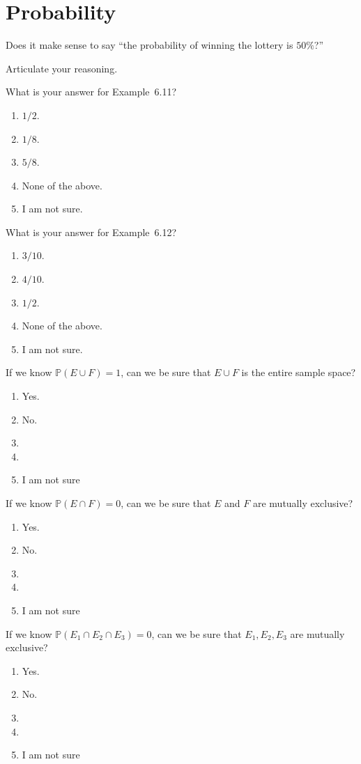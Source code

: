 \documentclass[t, 14pt]{beamer}
\newcommand{\yesno}{
 \begin{enumerate}
    \item Yes.
    \item No.
    \item 
    \item 
    \item I am not sure
  \end{enumerate} 
}
\begin{document}
\section{Probability}

\begin{frame}[c]
  Does it make sense to say ``the probability of winning the lottery is \(50\%\)?''

  Articulate your reasoning. 
\end{frame}

\begin{frame}[c]
  What is your answer for Example~6.11?

  \begin{enumerate}
    \item \(1/2\).
    \item \(1/8\).
    \item \(5/8\).
    \item None of the above.
    \item I am not sure.
  \end{enumerate}
\end{frame}

\begin{frame}[c]
  What is your answer for Example~6.12?

  \begin{enumerate}
    \item \(3/10\).
    \item \(4/10\).
    \item \(1/2\).
    \item None of the above.
    \item I am not sure.
  \end{enumerate}
\end{frame}

\begin{frame}
  If we know \(\mathbb{P}(E \cup F) = 1\), can we be sure that \(E \cup F\) is the entire sample space?

  \yesno
\end{frame}

\begin{frame}
  If we know \(\mathbb{P}(E \cap F) = 0\), can we be sure that \(E\) and \(F\) are mutually exclusive?

  \yesno
\end{frame}

\begin{frame}
  If we know \(\mathbb{P}(E_{1} \cap E_{2} \cap E_{3}) = 0\), can we be sure that \(E_{1}, E_{2}, E_{3}\) are mutually exclusive?

  \yesno
\end{frame}
\end{document}
